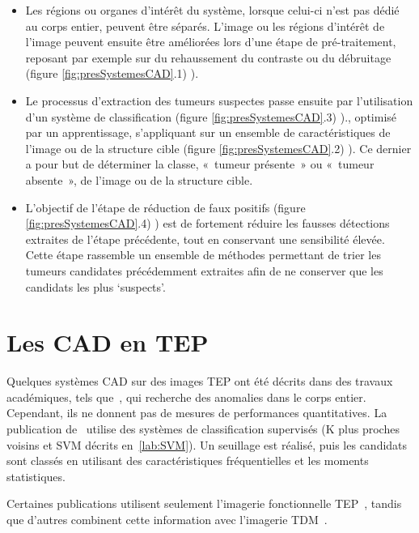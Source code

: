 \begin{itemize}
\item Les régions ou organes d’intérêt du système, lorsque celui-ci n’est pas dédié au corps entier, peuvent être séparés. L’image ou les régions d’intérêt de l’image peuvent ensuite être améliorées lors d’une étape de pré-traitement, reposant par exemple sur du rehaussement du contraste ou du débruitage (figure \ref{fig:presSystemesCAD}.1) ).
\item Le processus d’extraction des tumeurs suspectes passe ensuite par l’utilisation d’un système de classification (figure \ref{fig:presSystemesCAD}.3) )., optimisé par un apprentissage, s’appliquant sur un ensemble de caractéristiques de l’image ou de la structure cible (figure \ref{fig:presSystemesCAD}.2) ). Ce dernier a pour but de déterminer la classe, « tumeur présente » ou « tumeur absente », de l’image ou de la structure cible. 
\item L’objectif de l’étape de réduction de faux positifs (figure \ref{fig:presSystemesCAD}.4) ) est de fortement réduire les fausses détections extraites de l’étape précédente, tout en conservant une sensibilité élevée. Cette étape rassemble un ensemble de méthodes permettant de trier les tumeurs candidates précédemment extraites afin de ne conserver que les candidats les plus ‘suspects’.  
\end{itemize}

	\section{Les CAD en TEP}
\label{lab:CADTEP}

Quelques systèmes CAD sur des images TEP ont été décrits dans des travaux académiques, tels que~\cite{guan2006automatic}, qui recherche des anomalies dans le corps entier. Cependant, ils ne donnent pas de mesures de performances quantitatives. La publication de~\cite{kanakatte2008pulmonary} utilise des systèmes de classification supervisés (K plus proches voisins et SVM décrits en~\ref{lab:SVM}). Un seuillage est réalisé, puis les candidats sont classés en utilisant des caractéristiques fréquentielles et les moments statistiques. 

Certaines publications utilisent seulement l'imagerie fonctionnelle TEP~\cite{ying2004novel, kanakatte2007pilot, kanakatte2008pulmonary, saradhi2009framework, el2009exploring, mhd2010artificial}, tandis que d'autres combinent cette information avec l'imagerie TDM~\cite{jafar2006computerized, nie2006integrating, potesil2007automated}.


